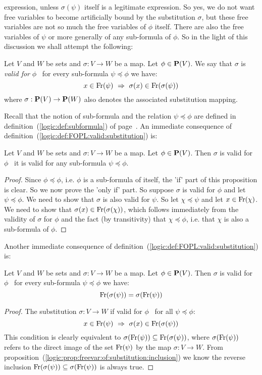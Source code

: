 expression, unless $\sigma(\psi)$ itself is a legitimate expression.
So yes, we do not want free variables to become artificially bound
by the substitution $\sigma$, but these free variables are not so
much the free variables of $\phi$ itself. There are also the free
variables of $\psi$ or more generally of any sub-formula of $\phi$.
So in the light of this discussion we shall attempt the following:
\begin{defin}\label{logic:def:FOPL:valid:substitution}
Let $V$ and $W$ be sets and $\sigma:V\to W$ be a map. Let
$\phi\in\mbox{${\bf P}(V)$}$. We say that $\sigma$ is {\em valid for} $\phi$ \ifand\
for every sub-formula $\psi\preceq\phi$ we have:
    \[
    x\in\free(\psi)\ \Rightarrow\ \sigma(x)\in\free(\sigma(\psi))
    \]
where $\sigma:\mbox{${\bf P}(V)$}\to{\bf P}(W)$ also denotes the associated
substitution mapping.
\end{defin}
Recall that the notion of sub-formula and the relation
$\psi\preceq\phi$ are defined in
definition~(\ref{logic:def:subformula}) of
page~\pageref{logic:def:subformula}. An immediate consequence of
definition~(\ref{logic:def:FOPL:valid:substitution}) is:
\begin{prop}\label{logic:prop:FOPL:valid:subformula}
Let $V$ and $W$ be sets and $\sigma:V\to W$ be a map. Let
$\phi\in\mbox{${\bf P}(V)$}$. Then $\sigma$ is valid for $\phi$ \ifand\ it is valid
for any sub-formula $\psi\preceq\phi$.
\end{prop}
\begin{proof}
Since $\phi\preceq\phi$, i.e. $\phi$ is a sub-formula of itself, the
'if' part of this proposition is clear. So we now prove the 'only
if' part. So suppose $\sigma$ is valid for $\phi$ and let
$\psi\preceq\phi$. We need to show that $\sigma$ is also valid for
$\psi$. So let $\chi\preceq\psi$ and let $x\in\mbox{\rm Fr}(\chi)$. We need
to show that $\sigma(x)\in\mbox{\rm Fr}(\sigma(\chi))$, which follows
immediately from the validity of $\sigma$ for $\phi$ and the fact
(by transitivity) that $\chi\preceq\phi$, i.e. that $\chi$ is also a
sub-formula of $\phi$.
\end{proof}

Another immediate consequence of
definition~(\ref{logic:def:FOPL:valid:substitution}) is:
\begin{prop}\label{logic:prop:FOPL:valid:free:commute}
Let $V$ and $W$ be sets and $\sigma:V\to W$ be a map. Let
$\phi\in\mbox{${\bf P}(V)$}$. Then $\sigma$ is valid for $\phi$ \ifand\ for every
sub-formula $\psi\preceq\phi$ we have:
    \[
    \mbox{\rm Fr}(\sigma(\psi)) =\sigma(\mbox{\rm Fr}(\psi))
    \]
\end{prop}
\begin{proof}
The substitution $\sigma:V\to W$ if valid for $\phi$ \ifand\ for all
$\psi\preceq\phi$:
    \[
    x\in\free(\psi)\ \Rightarrow\ \sigma(x)\in\free(\sigma(\psi))
    \]
This condition is clearly equivalent to
$\sigma(\mbox{\rm Fr}(\psi))\subseteq\mbox{\rm Fr}(\sigma(\psi))$, where
$\sigma(\mbox{\rm Fr}(\psi))$ refers to the direct image of the set
$\mbox{\rm Fr}(\psi)$ by the map $\sigma:V\to W$. From
proposition~(\ref{logic:prop:freevar:of:substitution:inclusion}) we
know the reverse inclusion
$\mbox{\rm Fr}(\sigma(\psi))\subseteq\sigma(\mbox{\rm Fr}(\psi))$ is always true.
\end{proof}


